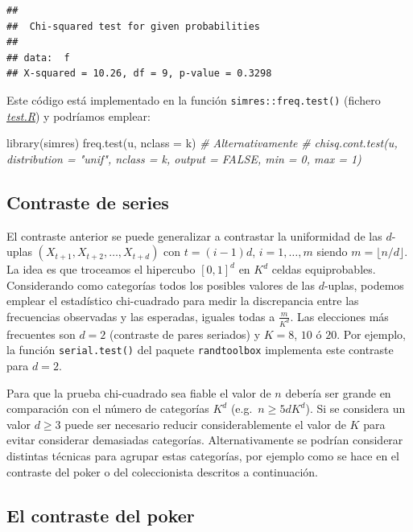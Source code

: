 \documentclass[
]{book}
\newenvironment{Shaded}{\begin{snugshade}}{\end{snugshade}}
\newcommand{\AttributeTok}[1]{\textcolor[rgb]{0.77,0.63,0.00}{#1}}
\newcommand{\CommentTok}[1]{\textcolor[rgb]{0.56,0.35,0.01}{\textit{#1}}}
\newcommand{\FunctionTok}[1]{\textcolor[rgb]{0.00,0.00,0.00}{#1}}
\newcommand{\NormalTok}[1]{#1}
\theoremstyle{break}
\theoremstyle{nonumberplain}
\begin{document}
\begin{verbatim}
## 
##  Chi-squared test for given probabilities
## 
## data:  f
## X-squared = 10.26, df = 9, p-value = 0.3298
\end{verbatim}

Este código está implementado en la función \texttt{simres::freq.test()} (fichero \href{R/test.R}{\emph{test.R}}) y podríamos emplear:

\begin{Shaded}
\begin{Highlighting}[]
\FunctionTok{library}\NormalTok{(simres)}
\FunctionTok{freq.test}\NormalTok{(u, }\AttributeTok{nclass =}\NormalTok{ k)}
\CommentTok{\# Alternativamente}
\CommentTok{\# chisq.cont.test(u, distribution = "unif", nclass = k, output = FALSE, min = 0, max = 1)}
\end{Highlighting}
\end{Shaded}

\hypertarget{contraste-de-series}{%
\subsection{Contraste de series}\label{contraste-de-series}}

El contraste anterior se puede generalizar a contrastar la uniformidad de las \(d\)-uplas \((X_{t+1},X_{t+2},\ldots,X_{t+d})\) con \(t=(i-1)d\), \(i=1,\ldots,m\) siendo \(m=\lfloor n/d \rfloor\).
La idea es que troceamos el hipercubo \([0, 1]^d\) en \(K^d\) celdas equiprobables.
Considerando como categorías todos los posibles valores de las \(d\)-uplas, podemos emplear el estadístico chi-cuadrado para medir la discrepancia entre las frecuencias observadas y las esperadas, iguales todas a \(\frac{m}{K^d}\).
Las elecciones más frecuentes son \(d=2\) (contraste de pares seriados) y \(K=8\), \(10\) ó \(20\).
Por ejemplo, la función \texttt{serial.test()} del paquete \texttt{randtoolbox} implementa este contraste para \(d=2\).

Para que la prueba chi-cuadrado sea fiable el valor de \(n\) debería ser grande en comparación con el número de categorías \(K^d\) (e.g.~\(n \geq 5dK^d\)).
Si se considera un valor \(d \geq 3\) puede ser necesario reducir considerablemente el valor de \(K\) para evitar considerar demasiadas categorías.
Alternativamente se podrían considerar distintas técnicas para agrupar estas categorías, por ejemplo como se hace en el contraste del poker o del coleccionista descritos a continuación.

\hypertarget{el-contraste-del-poker}{%
\subsection{El contraste del poker}\label{el-contraste-del-poker}}
\end{document}
